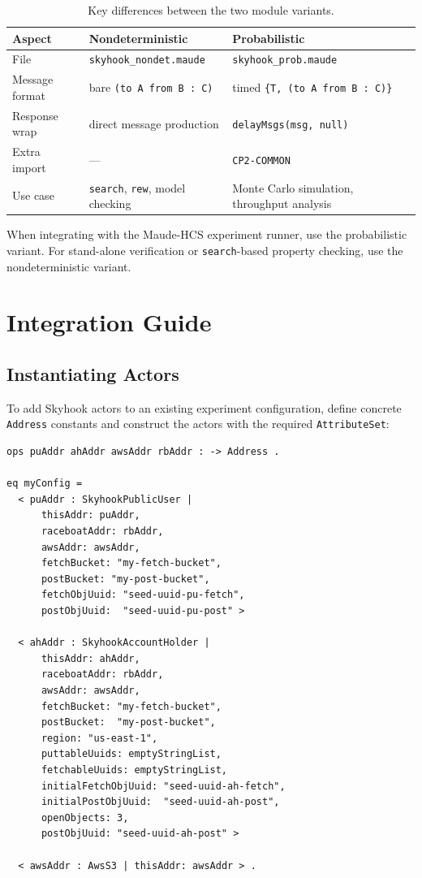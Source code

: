\documentclass[11pt]{article}
\begin{document}
\begin{table}[H]
\centering
\begin{tabular}{@{}lll@{}}
\toprule
\textbf{Aspect} & \textbf{Nondeterministic} & \textbf{Probabilistic} \\
\midrule
File           & \texttt{skyhook\_nondet.maude} & \texttt{skyhook\_prob.maude} \\
Message format & bare \texttt{(to A from B : C)} & timed \texttt{\{T, (to A from B : C)\}} \\
Response wrap  & direct message production & \texttt{delayMsgs(msg, null)} \\
Extra import   & --- & \texttt{CP2-COMMON} \\
Use case       & \texttt{search}, \texttt{rew}, model checking & Monte Carlo simulation, throughput analysis \\
\bottomrule
\end{tabular}
\caption{Key differences between the two module variants.}
\end{table}

When integrating with the Maude-HCS experiment runner, use the
probabilistic variant.  For stand-alone verification or
\texttt{search}-based property checking, use the nondeterministic
variant.

\section{Integration Guide}\label{sec:integration}

\subsection{Instantiating Actors}

To add Skyhook actors to an existing experiment configuration, define
concrete \texttt{Address} constants and construct the actors with the
required \texttt{AttributeSet}:

\begin{lstlisting}[caption={Minimal actor instantiation}]
ops puAddr ahAddr awsAddr rbAddr : -> Address .

eq myConfig =
  < puAddr : SkyhookPublicUser |
      thisAddr: puAddr,
      raceboatAddr: rbAddr,
      awsAddr: awsAddr,
      fetchBucket: "my-fetch-bucket",
      postBucket: "my-post-bucket",
      fetchObjUuid: "seed-uuid-pu-fetch",
      postObjUuid:  "seed-uuid-pu-post" >

  < ahAddr : SkyhookAccountHolder |
      thisAddr: ahAddr,
      raceboatAddr: rbAddr,
      awsAddr: awsAddr,
      fetchBucket: "my-fetch-bucket",
      postBucket:  "my-post-bucket",
      region: "us-east-1",
      puttableUuids: emptyStringList,
      fetchableUuids: emptyStringList,
      initialFetchObjUuid: "seed-uuid-ah-fetch",
      initialPostObjUuid:  "seed-uuid-ah-post",
      openObjects: 3,
      postObjUuid: "seed-uuid-ah-post" >

  < awsAddr : AwsS3 | thisAddr: awsAddr > .
\end{lstlisting}
\end{document}
